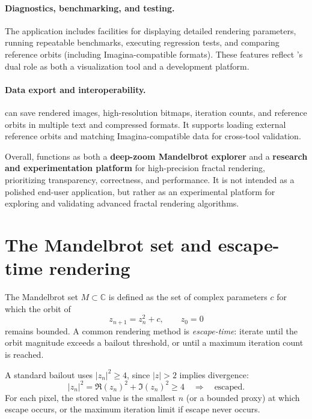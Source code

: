 \paragraph{Diagnostics, benchmarking, and testing.}
The application includes facilities for displaying detailed rendering
parameters, running repeatable benchmarks, executing regression tests, and
comparing reference orbits (including Imagina-compatible formats).  These
features reflect \FractalShark{}'s dual role as both a visualization tool and a
development platform.

\paragraph{Data export and interoperability.}
\FractalShark{} can save rendered images, high-resolution bitmaps, iteration
counts, and reference orbits in multiple text and compressed formats.  It
supports loading external reference orbits and matching Imagina-compatible
data for cross-tool validation.

\medskip
\noindent
Overall, \FractalShark{} functions as both a \textbf{deep-zoom Mandelbrot
explorer} and a \textbf{research and experimentation platform} for
high-precision fractal rendering, prioritizing transparency, correctness, and
performance.  It is not intended as a polished end-user application, but rather
as an experimental platform for exploring and validating advanced fractal
rendering algorithms.

\section{The Mandelbrot set and escape-time rendering}
\label{sec:mandelbrot-intro}

The Mandelbrot set \(M\subset\mathbb{C}\) \cite{Mandelbrot1980Fractal} is defined as the set of complex
parameters \(c\) for which the orbit of
\begin{equation}
z_{n+1} = z_n^2 + c,\qquad z_0 = 0
\end{equation}
remains bounded. A common rendering method is \emph{escape-time}: iterate until
the orbit magnitude exceeds a bailout threshold, or until a maximum iteration
count is reached.

A standard bailout uses \(|z_n|^2 \ge 4\), since \(|z|>2\) implies divergence:
\begin{equation}
|z_n|^2 = \Re(z_n)^2 + \Im(z_n)^2 \ge 4 \quad\Rightarrow\quad \text{escaped.}
\end{equation}
For each pixel, the stored value is the smallest \(n\) (or a bounded proxy) at
which escape occurs, or the maximum iteration limit if escape never occurs.


